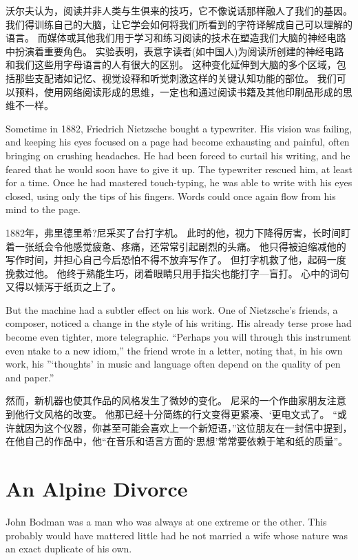 \documentclass[cs4size, a4paper, 12pt]{article}
\newcounter{numpar}
\newcommand*{\newpar}{\numpar{}}
\begin{document}
	沃尔夫认为，阅读并非人类与生俱来的技巧，它不像说话那样融人了我们的基因。 我们得训练自己的大脑，让它学会如何将我们所看到的字符译解成自己可以理解的语言。 而媒体或其他我们用于学习和练习阅读的技术在塑造我们大脑的神经电路中扮演着重要角色。 实验表明，表意字读者(如中国人)为阅读所创建的神经电路和我们这些用字母语言的人有很大的区别。 这种变化延伸到大脑的多个区域，包括那些支配诸如记忆、视觉设释和听觉刺激这样的关键认知功能的部位。 我们可以预料，使用网络阅读形成的思维，一定也和通过阅读书籍及其他印刷品形成的思维不一样。 
	
	\newpar Sometime in 1882, Friedrich Nietzsche bought a typewriter. His vision was failing, and keeping his eyes focused on a page had become exhausting and painful, often bringing on crushing headaches. He had been forced to curtail his writing, and he feared that he would soon have to give it up. The typewriter rescued him, at least for a time. Once he had mastered touch-typing, he was able to write with his eyes closed, using only the tips of his fingers. Words could once again flow from his mind to the page.
	
	1882年，弗里德里希?尼采买了台打字机。 此时的他，视力下降得厉害，长时间盯着一张纸会令他感觉疲惫、疼痛，还常常引起剧烈的头痛。 他只得被迫缩减他的写作时间，并担心自己今后恐怕不得不放弃写作了。 但打字机救了他，起码一度挽救过他。 他终于熟能生巧，闭着眼睛只用手指尖也能打字—盲打。 心中的词句又得以倾泻于纸页之上了。 
	
	\newpar But the machine had a subtler effect on his work. One of Nietzsche's friends, a composer, noticed a change in the style of his writing. His already terse prose had become even tighter, more telegraphic. ``Perhaps you will through this instrument even ntake to a new idiom,'' the friend wrote in a letter, noting that, in his own work, his ''`thoughts' in music and language often depend on the quality of pen and paper.''
	
	然而，新机器也使其作品的风格发生了微妙的变化。 尼采的一个作曲家朋友注意到他行文风格的改变。 他那已经十分简练的行文变得更紧凑、‘更电文式了。  ``或许就因为这个仪器，你甚至可能会喜欢上一个新短语，''这位朋友在一封信中提到，在他自己的作品中，他``在音乐和语言方面的‘思想’常常要依赖于笔和纸的质量''。 
	
	\section{An Alpine Divorce}
	
	\setcounter{numpar}{0}
	
	\newpar John Bodman was a man who was always at one extreme or the other. This probably would have mattered little had he not married a wife whose nature was an exact duplicate of his own. 
	
\end{document}
